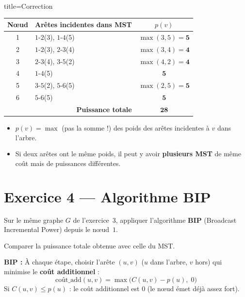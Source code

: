 \documentclass[12pt,a4paper]{article}
\begin{document}
\begin{correction}{title=Correction}
\begin{center}
\renewcommand{\arraystretch}{1.3}
\begin{tabular}{|c|l|c|}
\hline
\textbf{N\oe ud} & \textbf{Ar\^etes incidentes dans MST} & $p(v)$ \\\hline
1 & $1$-$2$(3), $1$-$4$(5) & $\max(3,5) = \mathbf{5}$ \\\hline
2 & $1$-$2$(3), $2$-$3$(4) & $\max(3,4) = \mathbf{4}$ \\\hline
3 & $2$-$3$(4), $3$-$5$(2) & $\max(4,2) = \mathbf{4}$ \\\hline
4 & $1$-$4$(5) & $\mathbf{5}$ \\\hline
5 & $3$-$5$(2), $5$-$6$(5) & $\max(2,5) = \mathbf{5}$ \\\hline
6 & $5$-$6$(5) & $\mathbf{5}$ \\\hline\hline
\multicolumn{2}{|r|}{\textbf{Puissance totale}} & $\mathbf{28}$ \\\hline
\end{tabular}
\end{center}
\end{correction}

\begin{attention}
\begin{itemize}
    \item $p(v) = \max$ (pas la somme !) des poids des ar\^etes incidentes \`a $v$ dans l'arbre.
    \item Si deux ar\^etes ont le m\^eme poids, il peut y avoir \textbf{plusieurs MST} de m\^eme co\^ut mais de puissances diff\'erentes.
\end{itemize}
\end{attention}


\newpage
\section{Exercice 4 --- Algorithme BIP}

\begin{enonce}
Sur le m\^eme graphe $G$ de l'exercice~3, appliquer l'algorithme \textbf{BIP} (Broadcast Incremental Power) depuis le n\oe ud~$1$.

Comparer la puissance totale obtenue avec celle du MST.
\end{enonce}

\begin{methode}
\textbf{BIP :} \`A chaque \'etape, choisir l'ar\^ete $(u,v)$ ($u$ dans l'arbre, $v$ hors) qui minimise le \textbf{co\^ut additionnel} :
$$\text{co\^ut\_add}(u,v) = \max\big(C(u,v) - p(u),\; 0\big)$$
Si $C(u,v) \leq p(u)$ : le co\^ut additionnel est $0$ (le n\oe ud \'emet d\'ej\`a assez fort).
\end{methode}
\end{document}
